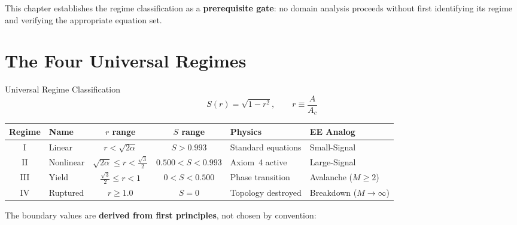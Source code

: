 This chapter establishes the regime classification as a \textbf{prerequisite gate}: no domain analysis proceeds without first identifying its regime and verifying the appropriate equation set.

\section{The Four Universal Regimes}

\begin{resultbox}{Universal Regime Classification}
\begin{equation}
    S(r) = \sqrt{1 - r^2}, \qquad r \equiv \frac{A}{A_c}
\end{equation}
\end{resultbox}

\begin{center}
\small
\renewcommand{\arraystretch}{1.2}
\begin{tabularx}{\textwidth}{@{}c l c c l X@{}}
\toprule
\textbf{Regime} & \textbf{Name} & \textbf{$r$ range} & \textbf{$S$ range} & \textbf{Physics} & \textbf{EE Analog} \\ \midrule
I   & Linear     & $r < \sqrt{2\alpha}$        & $S > 0.993$       & Standard equations  & Small-Signal \\
II  & Nonlinear  & $\sqrt{2\alpha} \leq r < \frac{\sqrt{3}}{2}$ & $0.500 < S < 0.993$ & Axiom~4 active  & Large-Signal \\
III & Yield      & $\frac{\sqrt{3}}{2} \leq r < 1$ & $0 < S < 0.500$   & Phase transition  & Avalanche ($M \geq 2$) \\
IV  & Ruptured   & $r \geq 1.0$       & $S = 0$           & Topology destroyed  & Breakdown ($M \to \infty$) \\
\bottomrule
\end{tabularx}
\end{center}

\noindent The boundary values are \textbf{derived from first principles}, not chosen by convention:

